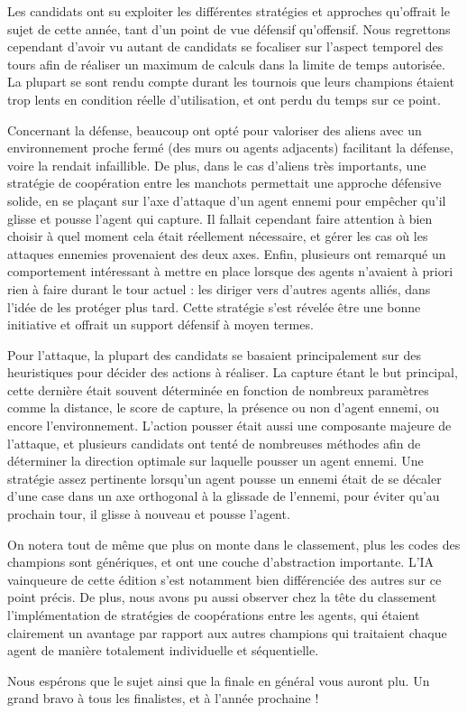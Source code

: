 \documentclass[a4paper,12pt,notitle,noheader,nofooter]{prologin}
\begin{document}
\bigbreak

Les candidats ont su exploiter les différentes stratégies et approches
qu'offrait le sujet de cette année, tant d'un point de vue défensif qu'offensif.
Nous regrettons cependant d'avoir vu autant de candidats se focaliser sur
l'aspect temporel des tours afin de réaliser un maximum de calculs dans la
limite de temps autorisée. La plupart se sont rendu compte durant les tournois
que leurs champions étaient trop lents en condition réelle d'utilisation, et ont
perdu du temps sur ce point.

\bigbreak

Concernant la défense, beaucoup ont opté pour valoriser des aliens avec un
environnement proche fermé (des murs ou agents adjacents) facilitant la défense,
voire la rendait infaillible. De plus, dans le cas d'aliens très importants, une
stratégie de coopération entre les manchots permettait une approche défensive
solide, en se plaçant sur l'axe d'attaque d'un agent ennemi pour empêcher qu'il
glisse et pousse l'agent qui capture. Il fallait cependant faire attention à
bien choisir à quel moment cela était réellement nécessaire, et gérer les cas où
les attaques ennemies provenaient des deux axes. Enfin, plusieurs ont remarqué
un comportement intéressant à mettre en place lorsque des agents n'avaient à
priori rien à faire durant le tour actuel : les diriger vers d'autres agents
alliés, dans l'idée de les protéger plus tard. Cette stratégie s'est révelée
être une bonne initiative et offrait un support défensif à moyen termes.

\bigbreak

Pour l'attaque, la plupart des candidats se basaient principalement sur des
heuristiques pour décider des actions à réaliser. La capture étant le but
principal, cette dernière était souvent déterminée en fonction de nombreux
paramètres comme la distance, le score de capture, la présence ou non d'agent
ennemi, ou encore l'environnement. L'action pousser était aussi une composante
majeure de l'attaque, et plusieurs candidats ont tenté de nombreuses méthodes 
afin de déterminer la direction optimale sur laquelle pousser un agent ennemi.
Une stratégie assez pertinente lorsqu'un agent pousse un ennemi était de se
décaler d'une case dans un axe orthogonal à la glissade de l'ennemi, pour éviter
qu'au prochain tour, il glisse à nouveau et pousse l'agent.

\newpage

On notera tout de même que plus on monte dans le classement, plus les codes des
champions sont génériques, et ont une couche d'abstraction importante. L'IA
vainqueure de cette édition s'est notamment bien différenciée des autres sur ce
point précis. De plus, nous avons pu aussi observer chez la tête du classement
l'implémentation de stratégies de coopérations entre les agents, qui étaient
clairement un avantage par rapport aux autres champions qui traitaient chaque
agent de manière totalement individuelle et séquentielle.

\bigbreak

Nous espérons que le sujet ainsi que la finale en général vous auront plu. Un
grand bravo à tous les finalistes, et à l'année prochaine !
\end{document}
